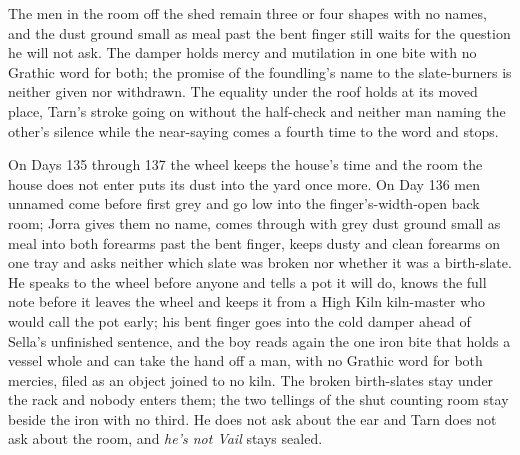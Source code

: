 \documentclass{design/chronicle}
\begin{document}
{The men in the room off the shed remain three or four shapes with no names, and the dust ground small as meal past the bent finger still waits for the question he will not ask. The damper holds mercy and mutilation in one bite with no Grathic word for both; the promise of the foundling’s name to the slate-burners is neither given nor withdrawn. The equality under the roof holds at its moved place, Tarn’s stroke going on without the half-check and neither man naming the other’s silence while the near-saying comes a fourth time to the word and stops.

On Days 135 through 137 the wheel keeps the house’s time and the room the house does not enter puts its dust into the yard once more. On Day 136 men unnamed come before first grey and go low into the finger’s-width-open back room; Jorra gives them no name, comes through with grey dust ground small as meal into both forearms past the bent finger, keeps dusty and clean forearms on one tray and asks neither which slate was broken nor whether it was a birth-slate. He speaks to the wheel before anyone and tells a pot it will do, knows the full note before it leaves the wheel and keeps it from a High Kiln kiln-master who would call the pot early; his bent finger goes into the cold damper ahead of Sella’s unfinished sentence, and the boy reads again the one iron bite that holds a vessel whole and can take the hand off a man, with no Grathic word for both mercies, filed as an object joined to no kiln. The broken birth-slates stay under the rack and nobody enters them; the two tellings of the shut counting room stay beside the iron with no third. He does not ask about the ear and Tarn does not ask about the room, and \emph{he’s not Vail} stays sealed.

}
\end{document}
